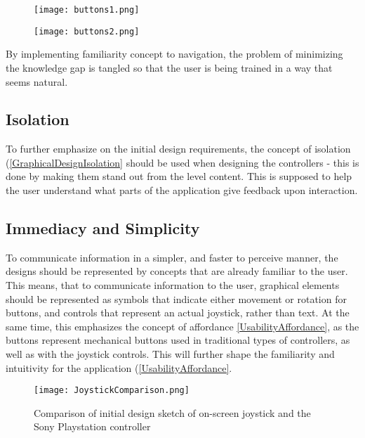 \begin{figure}[H]
\centering
\begin{minipage}{.5\textwidth}
  \centering
  \texttt{[image: buttons1.png]}
\end{minipage}%
\begin{minipage}{.5\textwidth}
  \centering
  \texttt{[image: buttons2.png]}
\end{minipage}
\end{figure}


By implementing familiarity concept to navigation, the problem of minimizing the knowledge gap is tangled so that the user is being trained in a way that seems natural.



\subsection{Isolation}
To further emphasize on the initial design requirements, the concept of isolation (\ref{GraphicalDesignIsolation} should be used when designing the controllers - this is done by making them stand out from the level content. This is supposed to help the user understand what parts of the application give feedback upon interaction.

\subsection{Immediacy and Simplicity}
To communicate information in a simpler, and faster to perceive manner, the designs should be represented by concepts that are already familiar to the user. This means, that to communicate information to the user, graphical elements should be represented as symbols that indicate either movement or rotation for buttons, and controls that represent an actual joystick, rather than
text. At the same time, this emphasizes the concept of affordance \ref{UsabilityAffordance}, as the buttons represent	mechanical buttons used in traditional types of controllers, as well as with the joystick controls. This will further shape the familiarity and intuitivity for the application (\ref{UsabilityAffordance}.

\begin{figure}[H]
\centering
\texttt{[image: JoystickComparison.png]}
\caption{Comparison of initial design sketch of on-screen joystick and the Sony Playstation controller}
\end{figure}

